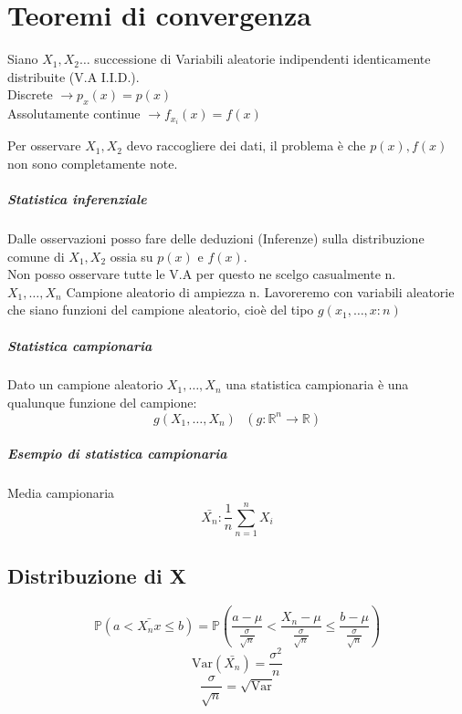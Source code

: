 \chapter{Teoremi di convergenza}
Siano $X_1, X_2 \dots $ successione di Variabili aleatorie indipendenti identicamente distribuite (V.A I.I.D.).
\\ Discrete $ \rightarrow p_x(x) = p(x) $
\\ Assolutamente continue $ \rightarrow f_{x_i} (x) = f(x) $

Per osservare $X_1, X_2$ devo raccogliere dei dati, il problema è che $p(x), f(x)$ non sono completamente
note. 
\paragraph*{Statistica inferenziale} Dalle osservazioni posso fare delle deduzioni (Inferenze) sulla distribuzione
comune di $X_1, X_2$ ossia su $p(x)$ e $f(x)$.
\\ Non posso osservare tutte le V.A per questo ne scelgo casualmente n. 
\\ $X_1, \dots ,X_n$ Campione aleatorio di ampiezza n. Lavoreremo con variabili aleatorie che siano funzioni del 
campione aleatorio, cioè del tipo $g(x_1, \dots ,x:n)$
\paragraph*{Statistica campionaria} Dato un campione aleatorio $X_1, \dots, X_n$ una statistica campionaria
è una qualunque funzione del campione:
\begin{equation*}
    g(X_1, \dots, X_n) \text{   } (g:\mathbb{R}^n\rightarrow\mathbb{R})
\end{equation*}

\paragraph*{Esempio di statistica campionaria} Media campionaria
\begin{equation*}
    \bar{X_n}:\frac{1}{n}\sum_{n=1}^n X_i
\end{equation*}
\section{Distribuzione di X}
\begin{equation*}
    \mathbb{P} (a  < \bar{X_nx} \leq b) = \mathbb{P} (\frac{a - \mu}{\frac{\sigma}{\sqrt{n}}} 
    < \frac{X_n - \mu}{\frac{\sigma}{\sqrt{n}}} \leq \frac{b - \mu}{\frac{\sigma}{\sqrt{n}}})   
\end{equation*}
\begin{equation*}
    \text{Var}(\bar{X_n}) = \frac{\sigma ^ 2}{n} 
\end{equation*}
\begin{equation*}
    \frac{\sigma}{\sqrt{n}} = \sqrt{\text{Var}}
\end{equation*}

